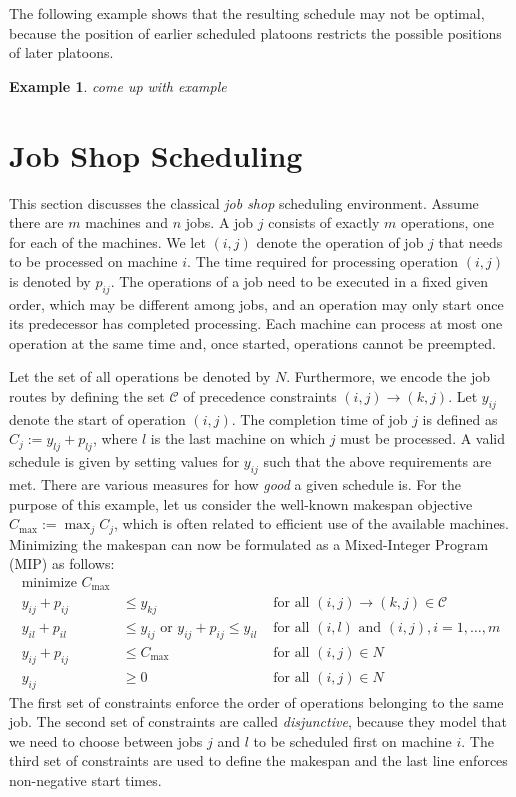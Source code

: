 \documentclass{article}
\theoremstyle{definition}
\newtheorem{eg}{Example}[section]
\theoremstyle{plain}
\begin{document}
The following example shows that the resulting schedule may not be optimal,
because the position of earlier scheduled platoons restricts the possible
positions of later platoons.
\begin{eg}
  \textit{\color{blue}come up with example}
\end{eg}


\newpage

\section{Job Shop Scheduling}

This section discusses the classical \textit{job shop} scheduling environment.
Assume there are $m$ machines and $n$ jobs. A job $j$ consists of exactly $m$
operations, one for each of the machines. We let $(i,j)$ denote the operation of
job $j$ that needs to be processed on machine $i$. The time required for
processing operation $(i,j)$ is denoted by $p_{ij}$. The operations of a job
need to be executed in a fixed given order, which may be different among jobs,
and an operation may only start once its predecessor has completed processing.
Each machine can process at most one operation at the same time and, once
started, operations cannot be preempted.

Let the set of all operations be denoted by $N$. Furthermore, we encode the job
routes by defining the set $\mathcal{C}$ of precedence constraints
$(i,j) \xrightarrow{} (k,j)$. Let $y_{ij}$ denote the start of operation
$(i,j)$. The completion time of job $j$ is defined as
$C_{j} := y_{lj} + p_{lj}$, where $l$ is the last machine on which $j$ must be
processed. A valid schedule is given by setting values for $y_{ij}$ such that
the above requirements are met. There are various measures for how \textit{good}
a given schedule is. For the purpose of this example, let us consider the
well-known makespan objective $C_{\text{max}} := \max_{j} C_{j}$, which is often
related to efficient use of the available machines. Minimizing the makespan can
now be formulated as a Mixed-Integer Program (MIP) as follows:
%
\begin{align*}
  \text{minimize } C_{\text{max}} \\
  y_{ij} + p_{ij} &\leq y_{kj}  & \text{ for all } (i,j) \xrightarrow{} (k,j) \in \mathcal{C} \\
  y_{il} + p_{il} &\leq  y_{ij} \text{ or } y_{ij} + p_{ij} \leq y_{il}  & \text{ for all } (i,l) \text{ and } (i,j), i =1, \dots,m \\
  y_{ij} + p_{ij} &\leq C_{\text{max}} & \text{ for all } (i,j) \in N \\
  y_{ij} &\geq 0 & \text{ for all } (i,j) \in N
\end{align*}
%
The first set of constraints enforce the order of operations belonging to the
same job. The second set of constraints are called \textit{disjunctive}, because
they model that we need to choose between jobs $j$ and $l$ to be scheduled first
on machine $i$. The third set of constraints are used to define the makespan and the
last line enforces non-negative start times.
\end{document}
